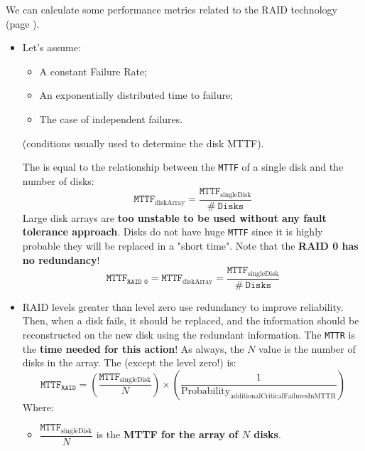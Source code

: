 We can calculate some performance metrics related to the RAID technology (page \pageref{paragraph: RAID}).
\begin{itemize}
    \item Let's assume:
    \begin{itemize}
        \item A constant Failure Rate;
        \item An exponentially distributed time to failure;
        \item The case of independent failures.
    \end{itemize}
    (conditions usually used to determine the disk MTTF). 
    
    The  is equal to the relationship between the \texttt{MTTF} of a single disk and the number of disks:
    \begin{equation}\label{eq: Mean Time To Failure of a disk array}
        \texttt{MTTF}_{\text{diskArray}} = \dfrac{\texttt{MTTF}_{\text{singleDisk}}}{\# \: \texttt{Disks}}
    \end{equation}
    Large disk arrays are \textbf{too unstable to be used without any fault tolerance approach}. Disks do not have huge \texttt{MTTF} since it is highly probable they will be replaced in a "short time". Note that the \textbf{RAID 0 has no redundancy}!
    \begin{equation}
        \texttt{MTTF}_{\texttt{RAID 0}} = \texttt{MTTF}_{\text{diskArray}} = \dfrac{\texttt{MTTF}_{\text{singleDisk}}}{\# \: \texttt{Disks}}
    \end{equation}


    \item RAID levels greater than level zero use redundancy to improve reliability. Then, when a disk fails, it should be replaced, and the information should be reconstructed on the new disk using the redundant information. The \texttt{MTTR} is the \textbf{time needed for this action}! As always, the $N$ value is the number of disks in the array. The  (except the level zero!) is:
    \begin{equation}\label{eq: Mean Time To Failure of a RAID}
        \texttt{MTTF}_{\texttt{RAID}} = \left(\dfrac{\texttt{MTTF}_{\text{singleDisk}}}{N}\right) \times \left(\dfrac{1}{\text{Probability}_{\text{additionalCriticalFailuresInMTTR}}}\right)
    \end{equation}
    Where:
    \begin{itemize}
        \item $\dfrac{\texttt{MTTF}_{\text{singleDisk}}}{N}$ is the \textbf{MTTF for the array of $N$ disks}.
        

\end{itemize}
\end{itemize}
